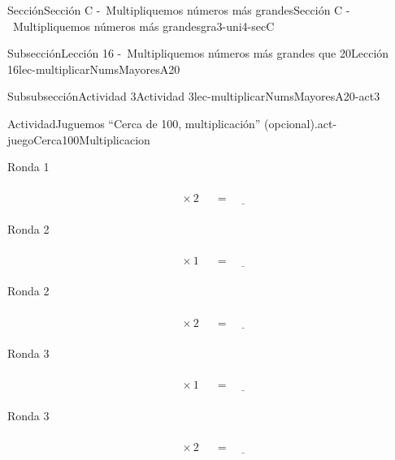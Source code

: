 \begin{sectionptx}{Sección}{Sección C -~Multipliquemos números más grandes}{}{Sección C -~Multipliquemos números más grandes}{}{}{gra3-uni4-secC}
\begin{subsectionptx}{Subsección}{Lección 16 -~Multipliquemos números más grandes que 20}{}{Lección 16}{}{}{lec-multiplicarNumsMayoresA20}
\begin{subsubsectionptx}{Subsubsección}{Actividad 3}{}{Actividad 3}{}{}{lec-multiplicarNumsMayoresA20-act3}
\begin{activity}{Actividad}{Juguemos “Cerca de 100, multiplicación” (opcional).}{act-juegoCerca100Multiplicacion}
\begin{sidebyside}{2}{0}{0}{0.1}
\begin{sbspanel}{0.45}%
Ronda 1%
\par
%
\begin{equation*}
\boxed{\phantom{\frac{00}{00}}} \times 2 \ \boxed{\phantom{\frac{00}{00}}}= \underline{\hspace{1cm}}
\end{equation*}
%
\end{sbspanel}%
\end{sidebyside}%
\begin{sidebyside}{2}{0}{0}{0.1}%
\begin{sbspanel}{0.45}%
Ronda 2%
\par
%
\begin{equation*}
\boxed{\phantom{\frac{00}{00}}} \times 1 \ \boxed{\phantom{\frac{00}{00}}}= \underline{\hspace{1cm}}
\end{equation*}
%
\end{sbspanel}%
\begin{sbspanel}{0.45}%
Ronda 2%
\par
%
\begin{equation*}
\boxed{\phantom{\frac{00}{00}}} \times 2 \ \boxed{\phantom{\frac{00}{00}}}= \underline{\hspace{1cm}}
\end{equation*}
%
\end{sbspanel}%
\end{sidebyside}%
\begin{sidebyside}{2}{0}{0}{0.1}%
\begin{sbspanel}{0.45}%
Ronda 3%
\par
%
\begin{equation*}
\boxed{\phantom{\frac{00}{00}}} \times 1 \ \boxed{\phantom{\frac{00}{00}}}= \underline{\hspace{1cm}}
\end{equation*}
%
\end{sbspanel}%
\begin{sbspanel}{0.45}%
Ronda 3%
\par
%
\begin{equation*}
\boxed{\phantom{\frac{00}{00}}} \times 2 \ \boxed{\phantom{\frac{00}{00}}}= \underline{\hspace{1cm}}
\end{equation*}
%
\end{sbspanel}%
\end{sidebyside}%
\begin{sidebyside}{2}{0}{0}{0.1}%
\begin{sbspanel}{0.45}%

\end{sbspanel}
\end{sidebyside}
\end{activity}
\end{subsubsectionptx}
\end{subsectionptx}
\end{sectionptx}
